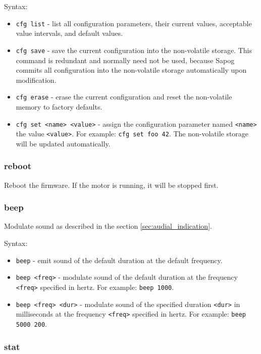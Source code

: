 \documentclass{zubaxdoc}
\begin{document}
Syntax:
\begin{itemize}
\item \verb|cfg list| - list all configuration parameters, their current values,
acceptable value intervals, and default values.
\item \verb|cfg save| - save the current configuration into the non-volatile storage.
This command is redundant and normally need not be used, because Sapog commits all configuration
into the non-volatile storage automatically upon modification.
\item \verb|cfg erase| - erase the current configuration and reset the non-volatile memory to factory defaults.
\item \verb|cfg set <name> <value>| - assign the configuration parameter named \verb|<name>| the value
\verb|<value>|. For example: \verb|cfg set foo 42|.
The non-volatile storage will be updated automatically.
\end{itemize}

\subsubsection{reboot}

Reboot the firmware.
If the motor is running, it will be stopped first.

\subsubsection{beep}

Modulate sound as described in the section \ref{sec:audial_indication}.

Syntax:
\begin{itemize}
\item \verb|beep| - emit sound of the default duration at the default frequency.
\item \verb|beep <freq>| - modulate sound of the default duration at the frequency \verb|<freq>|
specified in hertz. For example: \verb|beep 1000|.
\item \verb|beep <freq> <dur>| - modulate sound of the specified duration \verb|<dur>| in milliseconds
at the frequency \verb|<freq>| specified in hertz. For example: \verb|beep 5000 200|.
\end{itemize}

\subsubsection{stat}
\end{document}
